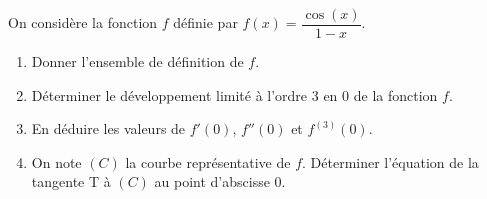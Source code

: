 
\begin{exercice}\label{exoautoanalyseCTU-44}



On considère la fonction $f$ définie par $f(x)=\dfrac{\cos (x)}{1-x}$.
\begin{enumerate}
\item Donner l'ensemble de définition de $f$.
\item Déterminer le développement limité  à l'ordre 3 en 0 de la fonction $f$.
\item En déduire les valeurs de $f'(0)$, $f''(0)$ et $f^{(3)}(0)$.
\item On note $(C)$ la courbe représentative de $f$. 
 Déterminer l'équation de la tangente  T à $(C)$ au point d'abscisse 0.


\end{enumerate}





\end{exercice}
